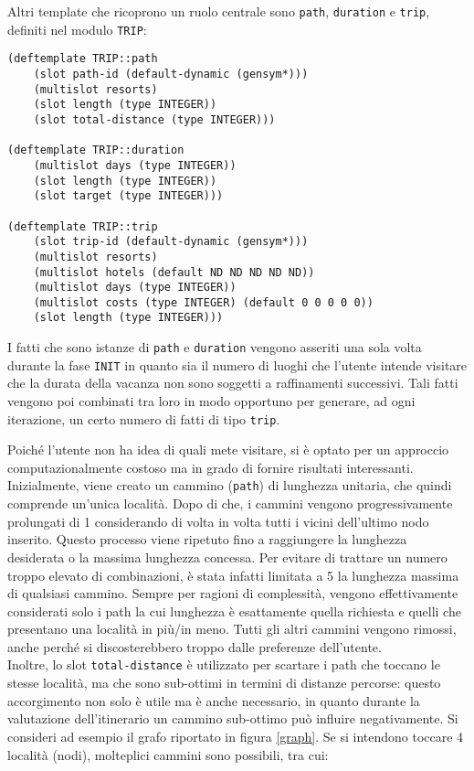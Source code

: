 Altri template che ricoprono un ruolo centrale sono \texttt{path}, \texttt{duration} e \texttt{trip}, definiti nel modulo \texttt{TRIP}:

\begin{lstlisting}[frame=single]
(deftemplate TRIP::path
    (slot path-id (default-dynamic (gensym*)))
    (multislot resorts)
    (slot length (type INTEGER))
    (slot total-distance (type INTEGER)))

(deftemplate TRIP::duration
    (multislot days (type INTEGER))
    (slot length (type INTEGER))
    (slot target (type INTEGER)))

(deftemplate TRIP::trip
    (slot trip-id (default-dynamic (gensym*)))
    (multislot resorts)
    (multislot hotels (default ND ND ND ND ND))
    (multislot days (type INTEGER))
    (multislot costs (type INTEGER) (default 0 0 0 0 0))
    (slot length (type INTEGER)))
\end{lstlisting}

I fatti che sono istanze di \texttt{path} e \texttt{duration} vengono asseriti una sola volta durante la fase \texttt{INIT} in quanto sia il numero di luoghi che l'utente intende visitare che la durata della vacanza non sono soggetti a raffinamenti successivi. Tali fatti vengono poi combinati tra loro in modo opportuno per generare, ad ogni iterazione, un certo numero di fatti di tipo \texttt{trip}.

Poiché l'utente non ha idea di quali mete visitare, si è optato per un approccio computazionalmente costoso ma in grado di fornire risultati interessanti. Inizialmente, viene creato un cammino (\texttt{path}) di lunghezza unitaria, che quindi comprende un'unica località. Dopo di che, i cammini vengono progressivamente prolungati di 1 considerando di volta in volta tutti i vicini dell'ultimo nodo inserito. Questo processo viene ripetuto fino a raggiungere la lunghezza desiderata o la massima lunghezza concessa. Per evitare di trattare un numero troppo elevato di combinazioni, è stata infatti limitata a 5 la lunghezza massima di qualsiasi cammino. Sempre per ragioni di complessità, vengono effettivamente considerati solo i path la cui lunghezza è esattamente quella richiesta e quelli che presentano una località in più/in meno. Tutti gli altri cammini vengono rimossi, anche perché si discosterebbero troppo dalle preferenze dell'utente. \\
Inoltre, lo slot \texttt{total-distance} è utilizzato per scartare i path che toccano le stesse località, ma che sono sub-ottimi in termini di distanze percorse: questo accorgimento non solo è utile ma è anche necessario, in quanto durante la valutazione dell'itinerario un cammino sub-ottimo può influire negativamente. Si consideri ad esempio il grafo riportato in figura \ref{graph}. Se si intendono toccare 4 località (nodi), molteplici cammini sono possibili, tra cui:


